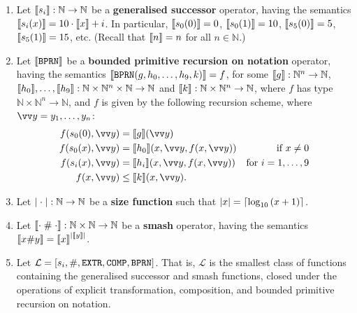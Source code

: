 \def\smashf{\ensuremath{\mathtt{\#}}}
\def\cdotnot{\ensuremath{\cdot}}

\begin{definition} \cite{cobham-1965}

\begin{enumerate}[label=(\arabic*)]

\item Let $\sem{s_i} : \mathbb{N} \rightarrow \mathbb{N}$ be a
\textbf{generalised successor} operator, having the semantics $\sem{s_i\p{x}} =
10 \cdot \sem{x} + i$. In particular, $\sem{s_0\p{0}} = 0$, $\sem{s_0\p{1}} =
10$, $\sem{s_5\p{0}} = 5$, $\sem{s_5\p{1}} = 15$, etc. (Recall that $\sem{n} =
n$ for all $n \in \mathbb{N}$.)

\item Let $\sem{\mathtt{BPRN}}$ be a \textbf{bounded primitive recursion on
notation} operator, having the semantics
$\sem{\mathtt{BPRN}\p{g,h_0,\ldots,h_9,k}} = f$, for some $\sem{g} :
\mathbb{N}^n \rightarrow \mathbb{N}$, $\sem{h_0}, \ldots, \sem{h_9} :
\mathbb{N} \times \mathbb{N}^n \times \mathbb{N} \rightarrow \mathbb{N}$ and
$\sem{k} : \mathbb{N} \times \mathbb{N}^n \rightarrow \mathbb{N}$, where $f$
has type $\mathbb{N} \times \mathbb{N}^n \rightarrow \mathbb{N}$, and $f$ is
given by the following recursion scheme, where $\vect{y} =
y_1,\ldots,y_n$:\begin{align*}
%
f\p{s_0\p{0}, \vect{y}} &= \sem{g}\p{\vect{y}} \\
%
f\p{s_0\p{x}, \vect{y}} &= \sem{h_0}\p{x, \vect{y}, f\p{x, \vect{y}}} &
\text{if $x\neq 0$}\\
%
f\p{s_i\p{x}, \vect{y}} &= \sem{h_i}\p{x, \vect{y}, f\p{x, \vect{y}}} &
\text{for $i=1,\ldots,9$} \\
%
f\p{x, \vect{y}} &\leq \sem{k}\p{x, \vect{y}}.
%
\end{align*}

\item Let $\card{\mathrel{}\cdotnot\mathrel{}} : \mathbb{N} \rightarrow
\mathbb{N}$ be a \textbf{size function} such that $\card{x} =
\ceil{\log_{10}\p{x+1}}$.

\item Let $\sem{\cdotnot \; \smashf{} \; \cdotnot} : \mathbb{N} \times
\mathbb{N} \rightarrow \mathbb{N}$ be a \textbf{smash} operator, having the
semantics $\sem{x \smashf{} y} = \sem{x}^\card{\sem{y}}$.

\item Let $\mathcal{L} = \seq{s_i, \smashf{}, \mathtt{EXTR}, \mathtt{COMP},
\mathtt{BPRN}}$. That is, $\mathcal{L}$ is the smallest class of functions
containing the generalised successor and smash functions, closed under the
operations of explicit transformation, composition, and bounded primitive
recursion on notation.
 
\end{enumerate}

\end{definition}

